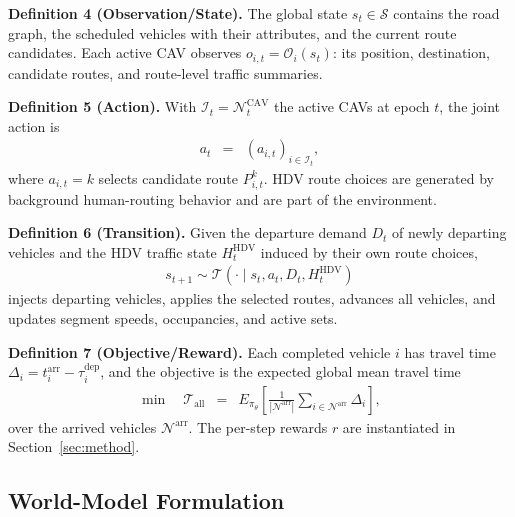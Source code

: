 \noindent\textbf{Definition 4 (Observation/State).}
The global state \(s_t\in\mathcal{S}\) contains the road graph, the
scheduled vehicles with their attributes, and the current route candidates.
Each active CAV observes \(o_{i,t}=\mathcal{O}_i(s_t)\): its position,
destination, candidate routes, and route-level traffic summaries.

\noindent\textbf{Definition 5 (Action).}
With \(\mathcal{I}_t=\mathcal{N}^{\mathrm{CAV}}_t\) the active CAVs at
epoch \(t\), the joint action is
\begin{equation}
\begin{array}{rcl}
a_t&=&(a_{i,t})_{i\in\mathcal{I}_t},
\end{array}
\end{equation}
where \(a_{i,t}=k\) selects candidate route \(P^k_{i,t}\).  HDV route
choices are generated by background human-routing behavior and are part of
the environment.

\noindent\textbf{Definition 6 (Transition).}
Given the departure demand \(D_t\) of newly departing vehicles and the HDV
traffic state \(H_t^{\mathrm{HDV}}\) induced by their own route choices,
\begin{equation}
\begin{array}{l}
s_{t+1}\sim
\mathcal{T}(\cdot\mid s_t,a_t,D_t,H_t^{\mathrm{HDV}})
\end{array}
\end{equation}
injects departing vehicles, applies the selected routes, advances all
vehicles, and updates segment speeds, occupancies, and active sets.

\noindent\textbf{Definition 7 (Objective/Reward).}
Each completed vehicle \(i\) has travel time
\(\Delta_i=t_i^{\mathrm{arr}}-\tau_i^{\mathrm{dep}}\), and the objective is
the expected global mean travel time
\begin{equation}
\begin{array}{rcl}
\min\quad
\mathcal{T}_{\mathrm{all}}&=&
\displaystyle
{E}_{\pi_\theta}
\left[
\frac{1}{|\mathcal{N}^{\mathrm{arr}}|}
\sum_{i\in\mathcal{N}^{\mathrm{arr}}}
\Delta_i
\right],
\end{array}
\end{equation}
over the arrived vehicles \(\mathcal{N}^{\mathrm{arr}}\).  The per-step
rewards \(r\) are instantiated in Section~\ref{sec:method}.

\subsection{World-Model Formulation}
\label{sec:wm-formulation}

